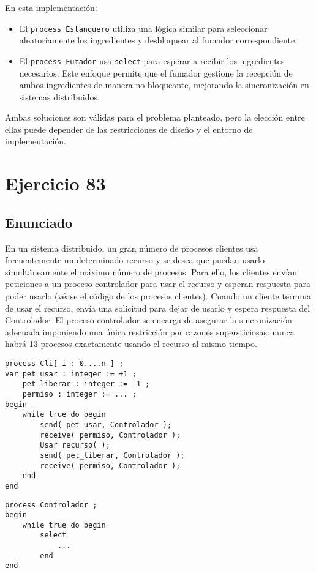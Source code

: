 \documentclass[a4paper,12pt]{article}
\begin{document}
En esta implementación:
\begin{itemize}
    \item El \texttt{process Estanquero} utiliza una lógica similar para seleccionar aleatoriamente los ingredientes y desbloquear al fumador correspondiente.
    \item El \texttt{process Fumador} usa \texttt{select} para esperar a recibir los ingredientes necesarios. Este enfoque permite que el fumador gestione la recepción de ambos ingredientes de manera no bloqueante, mejorando la sincronización en sistemas distribuidos.
\end{itemize}

Ambas soluciones son válidas para el problema planteado, pero la elección entre ellas puede depender de las restricciones de diseño y el entorno de implementación.


\section{Ejercicio 83}

\subsection{Enunciado}

En un sistema distribuido, un gran número de procesos clientes usa frecuentemente un determinado recurso y se desea que puedan usarlo simultáneamente el máximo número de procesos. Para ello, los clientes envían peticiones a un proceso controlador para usar el recurso y esperan respuesta para poder usarlo (véase el código de los procesos clientes). Cuando un cliente termina de usar el recurso, envía una solicitud para dejar de usarlo y espera respuesta del Controlador. El proceso controlador se encarga de asegurar la sincronización adecuada imponiendo una única restricción por razones supersticiosas: nunca habrá 13 procesos exactamente usando el recurso al mismo tiempo.

\begin{lstlisting}[style=customcpp]
process Cli[ i : 0....n ] ;
var pet_usar : integer := +1 ;
    pet_liberar : integer := -1 ;
    permiso : integer := ... ;
begin
    while true do begin
        send( pet_usar, Controlador );
        receive( permiso, Controlador );
        Usar_recurso( );
        send( pet_liberar, Controlador );
        receive( permiso, Controlador );
    end
end
\end{lstlisting}

\begin{lstlisting}[style=customcpp]
process Controlador ;
begin
    while true do begin
        select
            ...
        end
end
\end{lstlisting}
\end{document}
